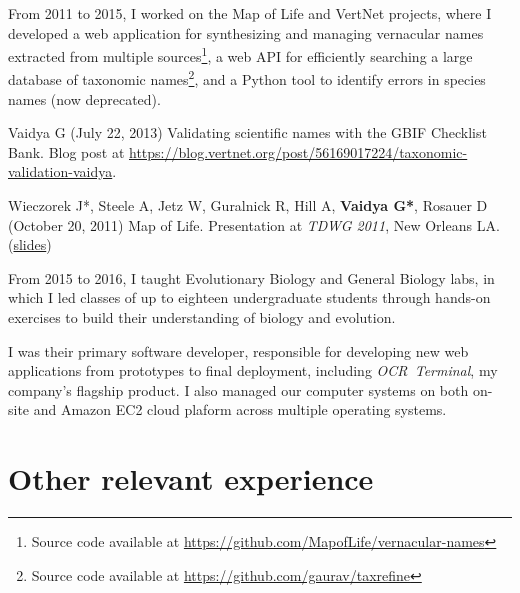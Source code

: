 \documentclass[12pt,letter]{article}
\begin{document}
From 2011 to 2015, I worked on the Map of Life and VertNet projects, where I developed a web application for synthesizing and managing vernacular names extracted from multiple sources\footnote{Source code available at \url{https://github.com/MapofLife/vernacular-names}}, a web API for efficiently searching a large database of taxonomic names\footnote{Source code available at \url{https://github.com/gaurav/taxrefine}}, and a Python tool to identify errors in species names (now deprecated).

\begin{publications}

\item Vaidya G (July 22, 2013) Validating scientific names with the GBIF Checklist Bank. Blog post at \url{https://blog.vertnet.org/post/56169017224/taxonomic-validation-vaidya}.

\item Wieczorek J*, Steele A, Jetz W, Guralnick R, Hill A, \textbf{Vaidya G*}, Rosauer D (October 20, 2011) Map of Life. Presentation at \textit{TDWG 2011}, New Orleans LA. (\href{https://speakerdeck.com/gaurav/map-of-life-computer-demo-at-tdwg-2011}{slides})

\end{publications}

From 2015 to 2016, I taught Evolutionary Biology and General Biology labs, in which I led classes of up to eighteen undergraduate students through hands-on exercises to build their understanding of biology and evolution.


I was their primary software developer, responsible for developing new web applications from prototypes to final deployment, including {\it OCR~Terminal}, my company's flagship product. I also managed our computer systems on both on-site and Amazon EC2 cloud plaform across multiple operating systems.



\part{Other relevant experience}
\end{document}
